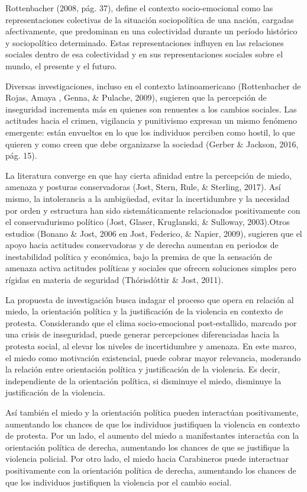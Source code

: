 \documentclass[12pt,twoside]{templates/facsothesis}
\begin{document}
Rottenbacher (2008, pág. 37), define el contexto socio-emocional como las representaciones colectivas de la situación sociopolítica de una nación, cargadas afectivamente, que predominan en una colectividad durante un período histórico y sociopolítico determinado. Estas representaciones influyen en las relaciones sociales dentro de esa colectividad y en sus representaciones sociales sobre el mundo, el presente y el futuro.

Diversas investigaciones, incluso en el contexto latinoamericano (Rottenbacher de Rojas, Amaya , Genna, \& Pulache, 2009), sugieren que la percepción de inseguridad incrementa más en quienes son renuentes a los cambios sociales. Las actitudes hacia el crimen, vigilancia y punitivismo expresan un mismo fenómeno emergente: están envueltos en lo que los individuos perciben como hostil, lo que quieren y como creen que debe organizarse la sociedad (Gerber \& Jackson, 2016, pág. 15).

La literatura converge en que hay cierta afinidad entre la percepción de miedo, amenaza y posturas conservadoras (Jost, Stern, Rule, \& Sterling, 2017). Así mismo, la intolerancia a la ambigüedad, evitar la incertidumbre y la necesidad por orden y estructura han sido sistemáticamente relacionados positivamente con el conservadurismo político (Jost, Glaser, Kruglanski, \& Sulloway, 2003).Otros estudios (Bonano \& Jost, 2006 en Jost, Federico, \& Napier, 2009), sugieren que el apoyo hacia actitudes conservadoras y de derecha aumentan en periodos de inestabilidad política y económica, bajo la premisa de que la sensación de amenaza activa actitudes políticas y sociales que ofrecen soluciones simples pero rígidas en materia de seguridad (Thórisdóttir \& Jost, 2011).

La propuesta de investigación busca indagar el proceso que opera en relación al miedo, la orientación política y la justificación de la violencia en contexto de protesta. Considerando que el clima socio-emocional post-estallido, marcado por una crisis de inseguridad, puede generar percepciones diferenciadas hacia la protesta social, al elevar los niveles de incertidumbre y amenaza. En este marco, el miedo como motivación existencial, puede cobrar mayor relevancia, moderando la relación entre orientación política y justificación de la violencia. Es decir, independiente de la orientación política, si disminuye el miedo, disminuye la justificación de la violencia.

Así también el miedo y la orientación política pueden interactúan positivamente, aumentando los chances de que los individuos justifiquen la violencia en contexto de protesta. Por un lado, el aumento del miedo a manifestantes interactúa con la orientación política de derecha, aumentando los chances de que se justifique la violencia policial. Por otro lado, el miedo hacia Carabineros puede interactuar positivamente con la orientación política de derecha, aumentando los chances de que los individuos justifiquen la violencia por el cambio social.
\end{document}
